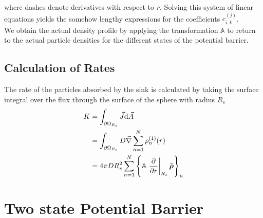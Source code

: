 where dashes denote derivatives with respect to $r$. Solving this system of linear equations yields the somehow lengthy expressions for the coefficients $c_{i,k}^{(j)}$. \\ We obtain the actual density profile by applying the transformation $\mathbb{A}$ to return to the actual particle densities for the different states of the potential barrier.
\subsection{Calculation of Rates}
\label{Rates}
The rate of the particles absorbed by the sink is calculated by taking the surface integral over the flux through the surface of the sphere with radius $R_s$
\begin{align}
    K   &= \int_{\partial \Omega_{R_s}} \vec{J} {\rm d} \vec{A}\nonumber\\
    &= \int_{\partial \Omega_{R_s}} D \vec{\nabla} \sum_{n=1}^{N} \rho_n^{(1)}(r)\nonumber \\
    &= 4 \pi D R_s^{2} \sum_{n=1}^{N} \left\{ \mathbb{A} \left. \frac{\partial}{ \partial r}\right|_{R_s} \tilde{\boldsymbol{\mathbf{\rho}}} \right\}_n
    \label{Rate}
\end{align}
\section{Two state Potential Barrier}
